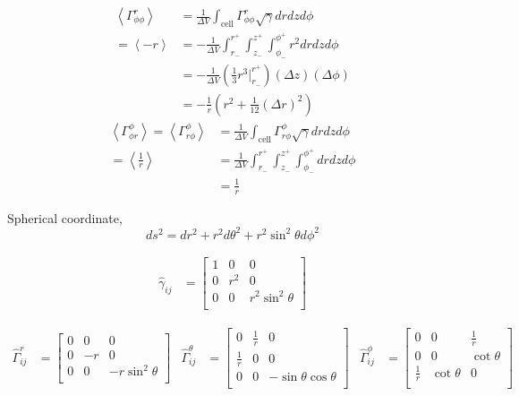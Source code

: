 \begin{align}
\left<\Gamma^{r}_{\phi\phi } \right> &= \frac{1}{\Delta V} \int_{\text{cell}} \Gamma^{r}_{\phi \phi} \sqrt{\gamma} dr dz d\phi \\
          = \left< - {r} \right> &= - \frac{1}{\Delta V} \int_{r_-}^{r^+} \int_{z_-}^{z^+} \int_{\phi_-}^{\phi^+} r^2 dr dz d\phi \\
         &=  - \frac{1}{\Delta V} \left( \frac{1}{3} r^3 \Big|_{r_-}^{r^+} \right) \left( \Delta z \right) \left( \Delta \phi \right)\\
         &= - \frac{1}{r} \left(r^2 + \frac{1}{12}\left(\Delta r\right)^2\right)
\end{align}
\begin{align}
\left<\Gamma^{\phi}_{\phi r} \right> = \left<\Gamma^{\phi}_{r \phi } \right> &= \frac{1}{\Delta V} \int_{\text{cell}} \Gamma^{\phi}_{r \phi} \sqrt{\gamma} dr dz d\phi \\
          = \left< \frac{1}{r} \right> &= \frac{1}{\Delta V} \int_{r_-}^{r^+} \int_{z_-}^{z^+} \int_{\phi_-}^{\phi^+} dr dz d\phi \\
         &= \frac{1}{r}
\end{align}

Spherical coordinate,
\begin{equation}
 ds^2 = dr^2 + r^2 d\theta^2 + r^2\sin^2\theta d\phi^2
\end{equation}

\begin{align}
	\hat{\gamma}_{ij} &= \begin{bmatrix}
		1 & 0 & 0 \\
		0 &r^2 & 0 \\
		0 & 0 &r^2 \sin^2\theta  \\
       	\end{bmatrix}
\end{align}


\begin{align}
	\hat{\Gamma}^r_{ij} &= \begin{bmatrix}
		0 & 0 & 0 \\
		0 &-r & 0 \\
		0 & 0 &-r \sin^2\theta  \\
       	\end{bmatrix} &
	\hat{\Gamma}^\theta_{ij} &= \begin{bmatrix}
		0 & \frac{1}{r} & 0 \\
		\frac{1}{r} & 0 & 0 \\
		0 & 0 & -\sin\theta\cos\theta  \\
       	\end{bmatrix} &
	\hat{\Gamma}^\phi_{ij} &= \begin{bmatrix}
		0 & 0 & \frac{1}{r}\\
		0 & 0 & \cot\theta \\
		\frac{1}{r} & \cot\theta & 0 \\
       	\end{bmatrix}
\end{align}

